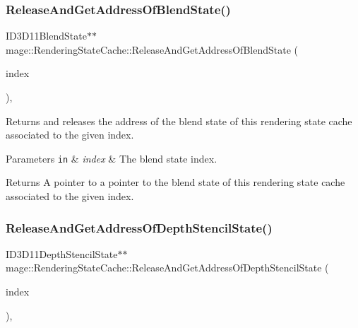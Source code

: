 \subsubsection{\texorpdfstring{Release\+And\+Get\+Address\+Of\+Blend\+State()}{ReleaseAndGetAddressOfBlendState()}}
{\footnotesize\ttfamily I\+D3\+D11\+Blend\+State$\ast$$\ast$ mage\+::\+Rendering\+State\+Cache\+::\+Release\+And\+Get\+Address\+Of\+Blend\+State (\begin{DoxyParamCaption}\item[{\hyperlink{structmage_1_1_rendering_state_cache_af1d994cc6a3134ded0b24353de5686d0}{Blend\+State\+Index}}]{index }\end{DoxyParamCaption})\hspace{0.3cm}{\ttfamily [private]}, {\ttfamily [noexcept]}}

Returns and releases the address of the blend state of this rendering state cache associated to the given index.


\begin{DoxyParams}[1]{Parameters}
\mbox{\tt in}  & {\em index} & The blend state index. \\
\hline
\end{DoxyParams}
\begin{DoxyReturn}{Returns}
A pointer to a pointer to the blend state of this rendering state cache associated to the given index. 
\end{DoxyReturn}
\hypertarget{structmage_1_1_rendering_state_cache_abc4a1c72c5540a6124cbc674daa6114b}{}\label{structmage_1_1_rendering_state_cache_abc4a1c72c5540a6124cbc674daa6114b} 
\subsubsection{\texorpdfstring{Release\+And\+Get\+Address\+Of\+Depth\+Stencil\+State()}{ReleaseAndGetAddressOfDepthStencilState()}}
{\footnotesize\ttfamily I\+D3\+D11\+Depth\+Stencil\+State$\ast$$\ast$ mage\+::\+Rendering\+State\+Cache\+::\+Release\+And\+Get\+Address\+Of\+Depth\+Stencil\+State (\begin{DoxyParamCaption}\item[{\hyperlink{structmage_1_1_rendering_state_cache_af6e27c63442c684390b23b6a85020f15}{Depth\+Stencil\+State\+Index}}]{index }\end{DoxyParamCaption})\hspace{0.3cm}{\ttfamily [private]}, {\ttfamily [noexcept]}}

